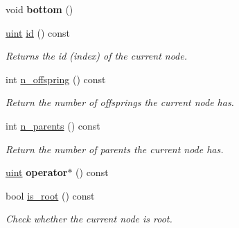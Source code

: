 \begin{DoxyCompactItemize}
void {\bfseries bottom} ()
\item 
\mbox{\label{classpruner_1_1TreeIterator_a526f5f2b7f6c6b93c5c4575ca5aba17d}} 
\hyperlink{namespacepruner_a659e6e64a9e2b8e981c3d34262a2f67e}{uint} \hyperlink{classpruner_1_1TreeIterator_a526f5f2b7f6c6b93c5c4575ca5aba17d}{id} () const
\begin{DoxyCompactList}\small\item\em Returns the id (index) of the current node. \end{DoxyCompactList}\item 
\mbox{\label{classpruner_1_1TreeIterator_a5773c903501a1dc91b11429a365dcfab}} 
int \hyperlink{classpruner_1_1TreeIterator_a5773c903501a1dc91b11429a365dcfab}{n\+\_\+offspring} () const
\begin{DoxyCompactList}\small\item\em Return the number of offsprings the current node has. \end{DoxyCompactList}\item 
\mbox{\label{classpruner_1_1TreeIterator_a3f2217bed38e63f9adc7376ab2bc035f}} 
int \hyperlink{classpruner_1_1TreeIterator_a3f2217bed38e63f9adc7376ab2bc035f}{n\+\_\+parents} () const
\begin{DoxyCompactList}\small\item\em Return the number of parents the current node has. \end{DoxyCompactList}\item 
\mbox{\label{classpruner_1_1TreeIterator_a2d71a902396aaa4b2517565499cca227}} 
\hyperlink{namespacepruner_a659e6e64a9e2b8e981c3d34262a2f67e}{uint} {\bfseries operator$\ast$} () const
\item 
\mbox{\label{classpruner_1_1TreeIterator_a975ec11f0ec121b0e5d0ebf0610c8f50}} 
bool \hyperlink{classpruner_1_1TreeIterator_a975ec11f0ec121b0e5d0ebf0610c8f50}{is\+\_\+root} () const
\begin{DoxyCompactList}\small\item\em Check whether the current node is root. \end{DoxyCompactList}\item 
\mbox{\label{classpruner_1_1TreeIterator_a988beb12324abb6c66f0a0f0f917f665}} 

\end{DoxyCompactItemize}
